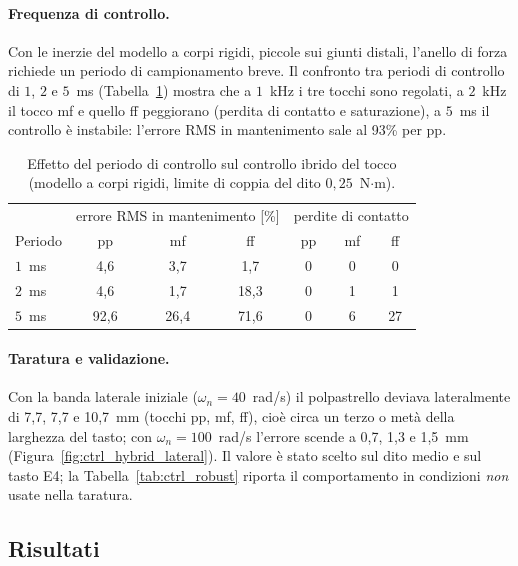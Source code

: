 \paragraph{Frequenza di controllo.} Con le inerzie del modello a corpi rigidi, piccole sui giunti distali, l'anello di forza richiede un periodo di campionamento breve. Il confronto tra periodi di controllo di $1$, $2$ e $5$~ms (Tabella~\ref{tab:ctrl_rate}) mostra che a $1$~kHz i tre tocchi sono regolati, a $2$~kHz il tocco mf e quello ff peggiorano (perdita di contatto e saturazione), a $5$~ms il controllo è instabile: l'errore RMS in mantenimento sale al 93\% per pp.

\begin{table}[htbp]
    \centering
    \renewcommand{\arraystretch}{1.1}
    \begin{tabular}{|l|ccc|ccc|}
        \hline
        & \multicolumn{3}{c|}{errore RMS in mantenimento [\%]} & \multicolumn{3}{c|}{perdite di contatto}\\
        Periodo & pp & mf & ff & pp & mf & ff\\ \hline \hline
        $1$~ms & 4,6 & 3,7 & 1,7 & 0 & 0 & 0\\
        $2$~ms & 4,6 & 1,7 & 18,3 & 0 & 1 & 1\\
        $5$~ms & 92,6 & 26,4 & 71,6 & 0 & 6 & 27\\
        \hline
    \end{tabular}
    \caption{Effetto del periodo di controllo sul controllo ibrido del tocco (modello a corpi rigidi, limite di coppia del dito $0{,}25$~N$\cdot$m).}
    \label{tab:ctrl_rate}
\end{table}

\paragraph{Taratura e validazione.} Con la banda laterale iniziale ($\omega_n=40$~rad/s) il polpastrello deviava lateralmente di 7,7, 7,7 e 10,7~mm (tocchi pp, mf, ff), cioè circa un terzo o metà della larghezza del tasto; con $\omega_n=100$~rad/s l'errore scende a 0,7, 1,3 e 1,5~mm (Figura~\ref{fig:ctrl_hybrid_lateral}). Il valore è stato scelto sul dito medio e sul tasto E4; la Tabella~\ref{tab:ctrl_robust} riporta il comportamento in condizioni \emph{non} usate nella taratura.

\subsection{Risultati}

